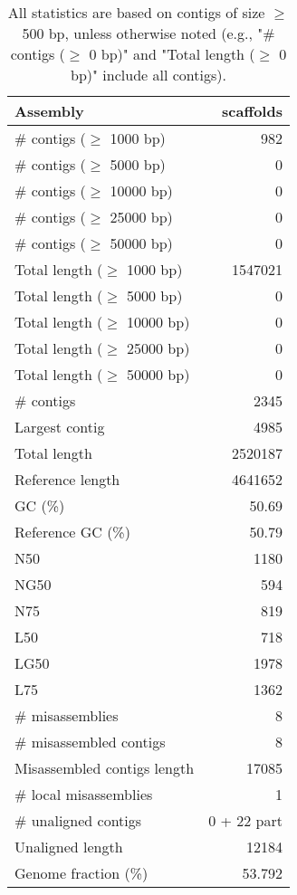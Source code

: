 \documentclass[12pt,a4paper]{article}
\begin{document}
\begin{table}[ht]
\begin{center}
\caption{All statistics are based on contigs of size $\geq$ 500 bp, unless otherwise noted (e.g., "\# contigs ($\geq$ 0 bp)" and "Total length ($\geq$ 0 bp)" include all contigs).}
\begin{tabular}{|l*{1}{|r}|}
\hline
Assembly & scaffolds \\ \hline
\# contigs ($\geq$ 1000 bp) & 982 \\ \hline
\# contigs ($\geq$ 5000 bp) & 0 \\ \hline
\# contigs ($\geq$ 10000 bp) & 0 \\ \hline
\# contigs ($\geq$ 25000 bp) & 0 \\ \hline
\# contigs ($\geq$ 50000 bp) & 0 \\ \hline
Total length ($\geq$ 1000 bp) & 1547021 \\ \hline
Total length ($\geq$ 5000 bp) & 0 \\ \hline
Total length ($\geq$ 10000 bp) & 0 \\ \hline
Total length ($\geq$ 25000 bp) & 0 \\ \hline
Total length ($\geq$ 50000 bp) & 0 \\ \hline
\# contigs & 2345 \\ \hline
Largest contig & 4985 \\ \hline
Total length & 2520187 \\ \hline
Reference length & 4641652 \\ \hline
GC (\%) & 50.69 \\ \hline
Reference GC (\%) & 50.79 \\ \hline
N50 & 1180 \\ \hline
NG50 & 594 \\ \hline
N75 & 819 \\ \hline
L50 & 718 \\ \hline
LG50 & 1978 \\ \hline
L75 & 1362 \\ \hline
\# misassemblies & 8 \\ \hline
\# misassembled contigs & 8 \\ \hline
Misassembled contigs length & 17085 \\ \hline
\# local misassemblies & 1 \\ \hline
\# unaligned contigs & 0 + 22 part \\ \hline
Unaligned length & 12184 \\ \hline
Genome fraction (\%) & 53.792 \\ \hline

\end{tabular}
\end{center}
\end{table}
\end{document}
